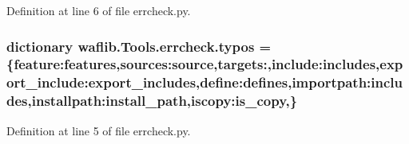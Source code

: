 Definition at line 6 of file errcheck.\+py.

\subsubsection[{\texorpdfstring{typos}{typos}}]{\setlength{\rightskip}{0pt plus 5cm}dictionary waflib.\+Tools.\+errcheck.\+typos = \{\textquotesingle{}feature\textquotesingle{}\+:\textquotesingle{}features\textquotesingle{},\textquotesingle{}sources\textquotesingle{}\+:\textquotesingle{}source\textquotesingle{},\textquotesingle{}targets\textquotesingle{}\+:\textquotesingle{},\textquotesingle{}include\textquotesingle{}\+:\textquotesingle{}includes\textquotesingle{},\textquotesingle{}export\+\_\+include\textquotesingle{}\+:\textquotesingle{}export\+\_\+includes\textquotesingle{},\textquotesingle{}define\textquotesingle{}\+:\textquotesingle{}defines\textquotesingle{},\textquotesingle{}importpath\textquotesingle{}\+:\textquotesingle{}includes\textquotesingle{},\textquotesingle{}installpath\textquotesingle{}\+:\textquotesingle{}install\+\_\+path\textquotesingle{},\textquotesingle{}iscopy\textquotesingle{}\+:\textquotesingle{}is\+\_\+copy\textquotesingle{},\}}\hypertarget{namespacewaflib_1_1_tools_1_1errcheck_a2444fbb2df07d64b595116a656d8095e}{}\label{namespacewaflib_1_1_tools_1_1errcheck_a2444fbb2df07d64b595116a656d8095e}


Definition at line 5 of file errcheck.\+py.

